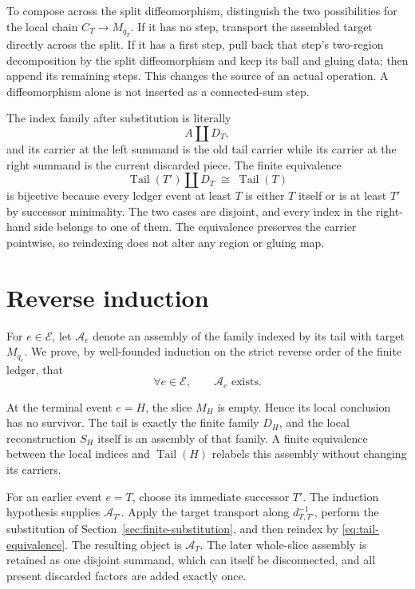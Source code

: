 To compose across the split diffeomorphism, distinguish the two possibilities
for the local chain $C_T\to M_{q_T}$.  If it has no step, transport the
assembled target directly across the split.  If it has a first step, pull
back that step's two-region decomposition by the split diffeomorphism and
keep its ball and gluing data; then append its remaining steps.  This changes
the source of an actual operation.  A diffeomorphism alone is not inserted as
a connected-sum step.

The index family after substitution is literally
\[
  A\amalg D_T,
\]
and its carrier at the left summand is the old tail carrier while its carrier
at the right summand is the current discarded piece.  The finite equivalence
\begin{equation}
  \operatorname{Tail}(T')\amalg D_T
       \;\cong\;\operatorname{Tail}(T)
  \label{eq:tail-equivalence}
\end{equation}
is bijective because every ledger event at least $T$ is either $T$ itself or is
at least $T'$ by successor minimality.  The two cases are disjoint, and every
index in the right-hand side belongs to one of them.  The equivalence preserves
the carrier pointwise, so reindexing does not alter any region or gluing map.

\section{Reverse induction}
\label{sec:finite-reverse-induction}

For $e\in\mathcal E$, let $\mathscr A_e$ denote an assembly of the family indexed by its tail
with target $M_{q_e}$.  We prove, by well-founded induction on the strict
reverse order of the finite ledger, that
\begin{equation}
  \forall e\in\mathcal E,\qquad
  \mathscr A_e\text{ exists}.
  \label{eq:reverse-invariant}
\end{equation}

At the terminal event $e=H$, the slice $M_H$ is empty.  Hence its local
conclusion has no survivor.  The tail is exactly the finite family $D_H$, and
the local reconstruction $S_H$ itself is an assembly of that family.  A
finite equivalence between the local indices and $\operatorname{Tail}(H)$
relabels this assembly without changing its carriers.

For an earlier event $e=T$, choose its immediate successor $T'$.  The
induction hypothesis supplies $\mathscr A_{T'}$.  Apply the target transport
along $d_{T,T'}^{-1}$, perform the substitution of
Section~\ref{sec:finite-substitution}, and then reindex by
\eqref{eq:tail-equivalence}.  The resulting object is $\mathscr A_T$.
The later whole-slice assembly is retained as one disjoint summand, which
can itself be disconnected, and all present discarded factors are added
exactly once.

